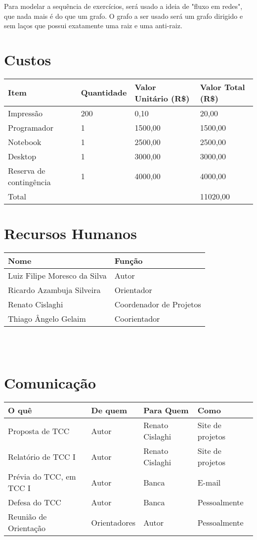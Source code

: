 \documentclass[12pt]{article}
\begin{document}
        Para modelar a sequência de exercícios, será usado a ideia de "fluxo em redes", que nada mais é do que um grafo. O grafo a ser usado será um grafo dirigido e sem laços que possui exatamente uma raiz e uma anti-raiz.

\newpage
\section{Custos}
	\begin{tabular}{l l l l}
		\hline
		Item					&	Quantidade	&	Valor Unitário (R\$)	&	Valor Total (R\$) \\
		\hline
		Impressão	&	200			&	0,10					&	20,00	\\
		
		Programador	&	1			&	1500,00					&	1500,00	\\
		Notebook	&	1 			&	2500,00					&	2500,00	\\
		Desktop     &   1           &   3000,00                 &   3000,00 \\
		Reserva de contingência	&	1 			&	4000,00					&	4000,00	\\
		\hline
		Total					&				&							&	11020,00
	\end{tabular}

\newpage
\section{Recursos Humanos}
    \begin{tabular}{l l}
        \hline
        Nome            				& Função \\
        \hline
        Luiz Filipe Moresco da Silva    	& Autor \\
        Ricardo Azambuja Silveira   	& Orientador \\
        Renato Cislaghi 				& Coordenador de Projetos \\
        Thiago Ângelo Gelaim            & Coorientador \\
        \hline
    \end{tabular}
    \\
    \\
    
\newpage
\section{Comunicação}
	\begin{tabular}{l l l l}
		\hline
		O quê  & De quem & Para Quem & Como \\
		\hline
		Proposta de TCC         & Autor		& Renato Cislaghi   & Site de projetos \\
		Relatório de TCC I      & Autor		& Renato Cislaghi   & Site de projetos \\
		Prévia do TCC, em TCC I & Autor		& Banca             & E-mail \\
		Defesa do TCC           & Autor		& Banca             & Pessoalmente \\
		Reunião de Orientação   & Orientadores	& Autor		    & Pessoalmente \\
		\hline
	\end{tabular}
\newpage
\end{document}
